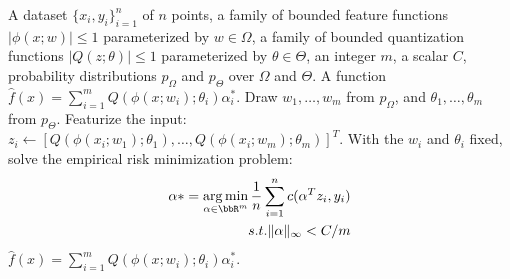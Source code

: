 \documentclass[12pt]{article}
\begin{document}
\begin{algorithm}
	\caption{%
		Low-Precision Weighted Sum of Random Kitchen Sinks Training (adapted from $[4]$)%
	}
	\label{alg:lprff}
	\begin{algorithmic}[1]
		\renewcommand{\algorithmicrequire}{\textbf{Input}}
		\REQUIRE
		A dataset $\{x_i,y_i\}_{i=1}^n$ of $n$ points, a family of bounded feature functions $|\phi(x;w)|\leq 1$ parameterized by $w\in\Omega$, a family of bounded quantization functions $|Q(z;\theta)| \leq 1$ parameterized by $\theta \in \Theta$, an integer $m$, a scalar $C$, probability distributions  $p_{\Omega}$ and $p_{\Theta}$ over $\Omega$ and $\Theta$.
		\renewcommand{\algorithmicrequire}{\textbf{Output}}
		\REQUIRE
		A function $\hat{f}(x) = \sum_{i=1}^m Q(\phi(x;w_i);\theta_i) \alpha^*_i$.
		\STATE Draw $w_1,\ldots,w_m$ from $p_{\Omega}$, and $\theta_1,\ldots,\theta_m$ from $p_{\Theta}$.
		\STATE Featurize the input: $z_i \leftarrow [Q(\phi(x_i;w_1);\theta_1),\ldots,Q(\phi(x_i;w_m);\theta_m)]^T$.
		\STATE With the $w_i$ and $\theta_i$ fixed, solve the empirical risk minimization problem:
		\begin{eqnarray*}
			\alpha* =\argmin_{\alpha\in\RR^m} \frac{1}{n}\sum_{i=1}^n c(\alpha^T z_i,y_i)\\
			s.t. \|\alpha\|_\infty < C/m
		\end{eqnarray*}
		\RETURN $\hat{f}(x) = \sum_{i=1}^m Q(\phi(x;w_i);\theta_i) \alpha^*_i$.
	\end{algorithmic}
\end{algorithm}
\end{document}
